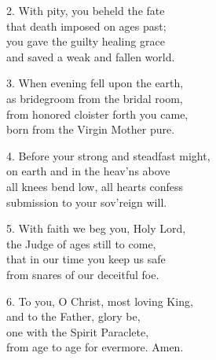 2. With pity, you beheld the fate\\
that death imposed on ages past;\\
you gave the guilty healing grace\\
and saved a weak and fallen world.

3. When evening fell upon the earth,\\
as bridegroom from the bridal room,\\
from honored cloister forth you came,\\
born from the Virgin Mother pure.

4. Before your strong and steadfast might,\\
on earth and in the heav’ns above\\
all knees bend low, all hearts confess\\
submission to your sov’reign will.

5. With faith we beg you, Holy Lord,\\
the Judge of ages still to come,\\
that in our time you keep us safe\\
from snares of our deceitful foe.

6. To you, O Christ, most loving King,\\
and to the Father, glory be,\\
one with the Spirit Paraclete,\\
from age to age for evermore. Amen.